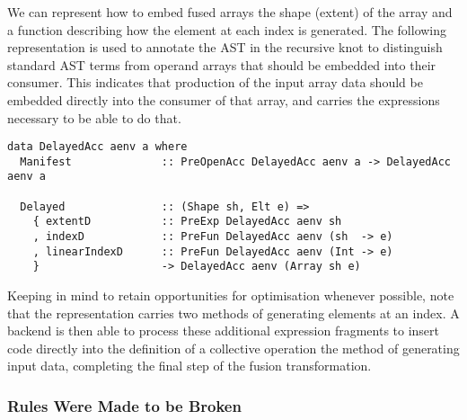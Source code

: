 We can represent how to embed fused arrays the shape (extent) of the array and a
function describing how the element at each index is generated. The following
representation is used to annotate the AST in the recursive knot to distinguish
standard AST terms from operand arrays that should be embedded into their
consumer. This indicates that production of the input array data should be
embedded directly into the consumer of that array, and carries the expressions
necessary to be able to do that.
%
\begin{lstlisting}[style=haskell]
data DelayedAcc aenv a where
  Manifest              :: PreOpenAcc DelayedAcc aenv a -> DelayedAcc aenv a

  Delayed               :: (Shape sh, Elt e) =>
    { extentD           :: PreExp DelayedAcc aenv sh
    , indexD            :: PreFun DelayedAcc aenv (sh  -> e)
    , linearIndexD      :: PreFun DelayedAcc aenv (Int -> e)
    }                   -> DelayedAcc aenv (Array sh e)
\end{lstlisting}
%
Keeping in mind to retain opportunities for optimisation whenever possible, note
that the representation carries two methods of generating elements at an index.
A backend is then able to process these additional expression fragments to
insert code directly into the definition of a collective operation the method of
generating input data, completing the final step of the fusion transformation.


\subsubsection{Rules Were Made to be Broken}

